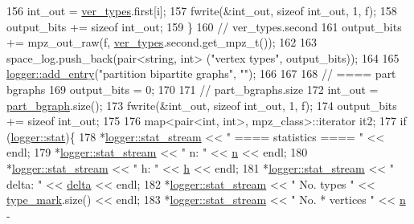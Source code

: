 \begin{DoxyCode}
156     int\_out = \hyperlink{classmarked__graph__compressed_af446cc5e23c241a92b76642fd5ebc403}{ver\_types}.first[i];
157     fwrite(&int\_out, \textcolor{keyword}{sizeof} int\_out, 1, f);
158     output\_bits += \textcolor{keyword}{sizeof} int\_out;
159   \}
160   \textcolor{comment}{// ver\_types.second}
161   output\_bits += mpz\_out\_raw(f, \hyperlink{classmarked__graph__compressed_af446cc5e23c241a92b76642fd5ebc403}{ver\_types}.second.get\_mpz\_t());
162 
163   space\_log.push\_back(pair<string, int> (\textcolor{stringliteral}{"vertex types"}, output\_bits));
164 
165   \hyperlink{classlogger_a710163deb17bc81f70d53d285b8ac9ac}{logger::add\_entry}(\textcolor{stringliteral}{"partition bipartite graphs"}, \textcolor{stringliteral}{""});
166   
167 
168   \textcolor{comment}{// ==== part bgraphs}
169   output\_bits = 0;
170 
171   \textcolor{comment}{// part\_bgraphs.size}
172   int\_out = \hyperlink{classmarked__graph__compressed_a7b3267063fba30b45eb21b3ba4e07536}{part\_bgraph}.size();
173   fwrite(&int\_out, \textcolor{keyword}{sizeof} int\_out, 1, f);
174   output\_bits += \textcolor{keyword}{sizeof} int\_out;
175 
176   map<pair<int, int>, mpz\_class>::iterator it2;
177   \textcolor{keywordflow}{if} (\hyperlink{classlogger_a26812b5ba03f130e8dae3446d5fc032f}{logger::stat})\{
178     *\hyperlink{classlogger_a7db37821f875f2ba3540980b355779f5}{logger::stat\_stream} << \textcolor{stringliteral}{" ==== statistics ==== "} << endl;
179     *\hyperlink{classlogger_a7db37821f875f2ba3540980b355779f5}{logger::stat\_stream} << \textcolor{stringliteral}{" n:                "} << \hyperlink{classmarked__graph__compressed_a8d841016ddb11cfd33748c8deb6277ba}{n} << endl;
180     *\hyperlink{classlogger_a7db37821f875f2ba3540980b355779f5}{logger::stat\_stream} << \textcolor{stringliteral}{" h:                "} << \hyperlink{classmarked__graph__compressed_af6ff623407b673d08d0cab77b39c2193}{h} << endl;
181     *\hyperlink{classlogger_a7db37821f875f2ba3540980b355779f5}{logger::stat\_stream} << \textcolor{stringliteral}{" delta:            "} << \hyperlink{classmarked__graph__compressed_a8b2aaac68e9332ddc78d88eb60b323a7}{delta} << endl;
182     *\hyperlink{classlogger_a7db37821f875f2ba3540980b355779f5}{logger::stat\_stream} << \textcolor{stringliteral}{" No. types         "} << 
      \hyperlink{classmarked__graph__compressed_a86b00223525703e973415cbc9c94da68}{type\_mark}.size() << endl;
183     *\hyperlink{classlogger_a7db37821f875f2ba3540980b355779f5}{logger::stat\_stream} << \textcolor{stringliteral}{" No. * vertices    "} << \hyperlink{classmarked__graph__compressed_a8d841016ddb11cfd33748c8deb6277ba}{n} - 

\end{DoxyCode}
